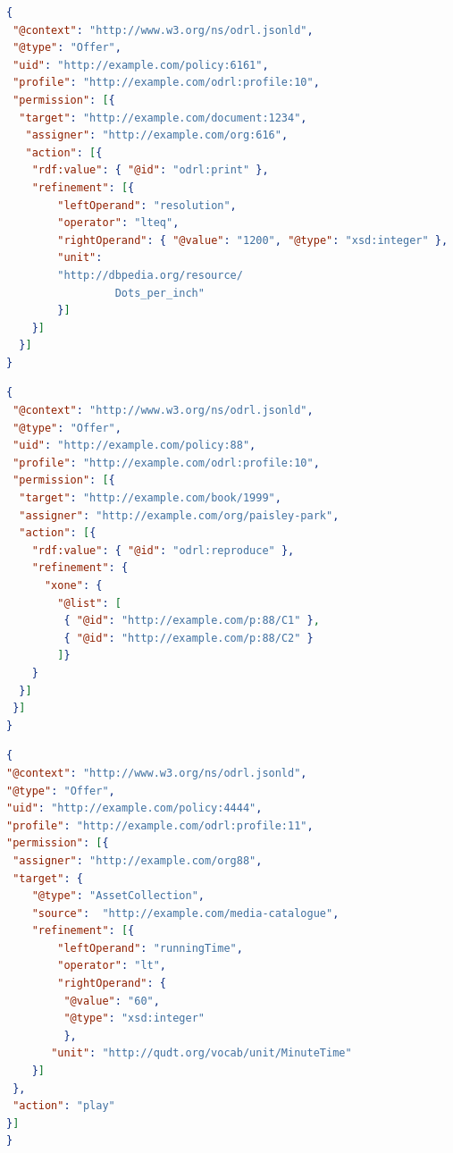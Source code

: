 \documentclass[12pt,a4paper,twoside]{book}
\begin{document}
\begin{lstlisting}[language=json,firstnumber=1,caption={Constraint su azione: l'azione \textbf{print} è permessa solo per risoluzioni minori di 1200 dpi},captionpos=b,label=esempioRef]
{
 "@context": "http://www.w3.org/ns/odrl.jsonld",
 "@type": "Offer",
 "uid": "http://example.com/policy:6161",
 "profile": "http://example.com/odrl:profile:10",
 "permission": [{
  "target": "http://example.com/document:1234",
   "assigner": "http://example.com/org:616",
   "action": [{
  	"rdf:value": { "@id": "odrl:print" },
  	"refinement": [{
  		"leftOperand": "resolution",
  		"operator": "lteq",
  		"rightOperand": { "@value": "1200", "@type": "xsd:integer" },
  		"unit": 
  		"http://dbpedia.org/resource/
                 Dots_per_inch"
    	}]
 	}]
  }]
}
\end{lstlisting}
\newpage
\begin{lstlisting}[language=json,firstnumber=1,caption={Constraint logico su azione: l'azione \textbf{reproduce} è permessa solo nella forma di uno dei due constraint listati},captionpos=b,label=esempioLogRef]
{
 "@context": "http://www.w3.org/ns/odrl.jsonld",
 "@type": "Offer",
 "uid": "http://example.com/policy:88",
 "profile": "http://example.com/odrl:profile:10",
 "permission": [{
  "target": "http://example.com/book/1999",
  "assigner": "http://example.com/org/paisley-park",
  "action": [{
    "rdf:value": { "@id": "odrl:reproduce" },
	"refinement": {
	  "xone": { 
	    "@list": [ 
		 { "@id": "http://example.com/p:88/C1" },
		 { "@id": "http://example.com/p:88/C2" } 
		]}
	}
  }]
 }]
}
\end{lstlisting}
\newpage
\begin{lstlisting}[language=json,firstnumber=1,caption={Constraint su asset: l'azione \textbf{play} è permessa solo sui target di durata strettamente inferiore a 60 minuti},captionpos=b,label=esempioConAss]
{
"@context": "http://www.w3.org/ns/odrl.jsonld",
"@type": "Offer",
"uid": "http://example.com/policy:4444",
"profile": "http://example.com/odrl:profile:11",
"permission": [{
 "assigner": "http://example.com/org88",
 "target": {
 	"@type": "AssetCollection",
 	"source":  "http://example.com/media-catalogue",
 	"refinement": [{
 		"leftOperand": "runningTime",
 		"operator": "lt",
 		"rightOperand": { 
 		 "@value": "60",
 		 "@type": "xsd:integer"
 		 },
 	   "unit": "http://qudt.org/vocab/unit/MinuteTime"
 	}]
 },
 "action": "play"
}]
}
\end{lstlisting}
\newpage
\end{document}
